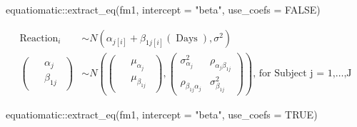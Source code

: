 \documentclass[
]{book}
\newenvironment{Shaded}{\begin{snugshade}}{\end{snugshade}}
\newcommand{\AttributeTok}[1]{\textcolor[rgb]{0.77,0.63,0.00}{#1}}
\newcommand{\ConstantTok}[1]{\textcolor[rgb]{0.00,0.00,0.00}{#1}}
\newcommand{\FunctionTok}[1]{\textcolor[rgb]{0.00,0.00,0.00}{#1}}
\newcommand{\NormalTok}[1]{#1}
\newcommand{\SpecialCharTok}[1]{\textcolor[rgb]{0.00,0.00,0.00}{#1}}
\newcommand{\StringTok}[1]{\textcolor[rgb]{0.31,0.60,0.02}{#1}}
\theoremstyle{definition}
\theoremstyle{definition}
\theoremstyle{definition}
\theoremstyle{definition}
\theoremstyle{remark}
\begin{document}
\begin{Shaded}
\begin{Highlighting}[]
\NormalTok{equatiomatic}\SpecialCharTok{::}\FunctionTok{extract\_eq}\NormalTok{(fm1, }\AttributeTok{intercept =} \StringTok{"beta"}\NormalTok{, }\AttributeTok{use\_coefs =} \ConstantTok{FALSE}\NormalTok{)}
\end{Highlighting}
\end{Shaded}

\[
\begin{aligned}
  \operatorname{Reaction}_{i}  &\sim N \left(\alpha_{j[i]} + \beta_{1j[i]}(\operatorname{Days}), \sigma^2 \right) \\    
\left(
  \begin{array}{c} 
    \begin{aligned}
      &\alpha_{j} \\
      &\beta_{1j}
    \end{aligned}
  \end{array}
\right)
  &\sim N \left(
\left(
  \begin{array}{c} 
    \begin{aligned}
      &\mu_{\alpha_{j}} \\
      &\mu_{\beta_{1j}}
    \end{aligned}
  \end{array}
\right)
, 
\left(
  \begin{array}{cc}
     \sigma^2_{\alpha_{j}} & \rho_{\alpha_{j}\beta_{1j}} \\ 
     \rho_{\beta_{1j}\alpha_{j}} & \sigma^2_{\beta_{1j}}
  \end{array}
\right)
 \right)
    \text{, for Subject j = 1,} \dots \text{,J}
\end{aligned}
\]

\begin{Shaded}
\begin{Highlighting}[]
\NormalTok{equatiomatic}\SpecialCharTok{::}\FunctionTok{extract\_eq}\NormalTok{(fm1, }\AttributeTok{intercept =} \StringTok{"beta"}\NormalTok{, }\AttributeTok{use\_coefs =} \ConstantTok{TRUE}\NormalTok{)}
\end{Highlighting}
\end{Shaded}
\end{document}
